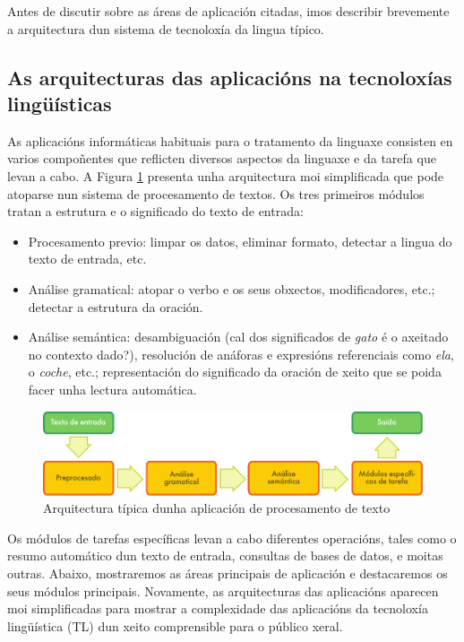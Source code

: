 \begin{multicols}{2}
Antes de discutir sobre as áreas de aplicación citadas, imos describir brevemente a arquitectura dun sistema de tecnoloxía da lingua típico.

\subsection[As arquitecturas das aplicacións na tecnoloxías lingüísticas]{As arquitecturas das \newline aplicacións na tecnoloxías lingüísticas}

    As aplicacións informáticas habituais para o tratamento da linguaxe consisten en varios compoñentes que reflicten diversos aspectos da linguaxe e da tarefa que levan a cabo. A Figura \ref{fig:textprocessingarch_ga} presenta unha arquitectura moi simplificada que pode atoparse nun sistema de procesamento de textos. Os tres primeiros módulos tratan a estrutura e o significado do texto de entrada:

\begin{itemize}
      \item Procesamento previo: limpar os datos, eliminar formato, detectar a lingua do texto de entrada, etc.
      \item Análise gramatical: atopar o verbo e os seus obxectos, modificadores, etc.; detectar a estrutura da oración.
      \item Análise semántica: desambiguación (cal dos significados de \textit{gato} é o axeitado no contexto dado?), resolución de anáforas e expresións referenciais como \textit{ela}, o \textit{coche}, etc.; representación do significado da oración de xeito que se poida facer unha lectura automática.
\end{itemize}

\begin{figure}[b]
  \center
  \includegraphics[width=\textwidth]{../_media/galician/text_processing_app_architecture}
  \caption{Arquitectura típica dunha aplicación de procesamento de texto}
  \label{fig:textprocessingarch_ga}
\end{figure}

    Os módulos de tarefas específicas levan a cabo diferentes operacións, tales como o resumo automático dun texto de entrada, consultas de bases de datos, e moitas outras. Abaixo, mostraremos as áreas principais de aplicación e destacaremos os seus módulos principais. Novamente, as arquitecturas das aplicacións aparecen moi simplificadas para mostrar a complexidade das aplicacións da tecnoloxía lingüística (TL) dun xeito comprensible para o público xeral. 


\end{multicols}
